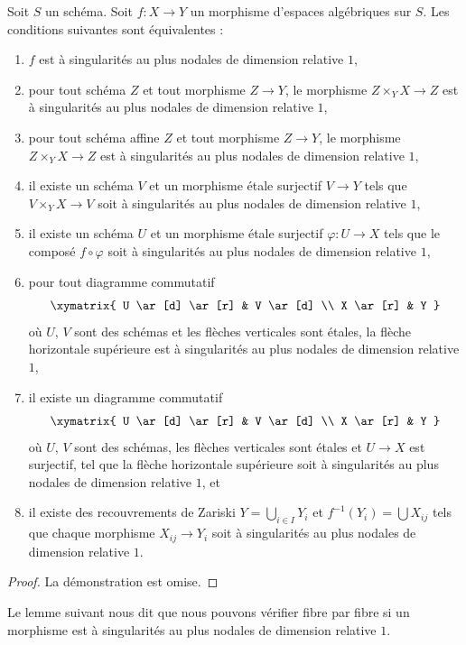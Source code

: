 \begin{lemma}
\label{lemma-nodal-local}
Soit $S$ un schéma.
Soit $f : X \to Y$ un morphisme d'espaces algébriques sur $S$.
Les conditions suivantes sont équivalentes :
\begin{enumerate}
\item $f$ est à singularités au plus nodales de dimension relative $1$,
\item pour tout schéma $Z$ et tout morphisme $Z \to Y$, le morphisme
$Z \times_Y X \to Z$ est à singularités au plus nodales de dimension relative $1$,
\item pour tout schéma affine $Z$ et tout morphisme
$Z \to Y$, le morphisme $Z \times_Y X \to Z$ est
à singularités au plus nodales de dimension relative $1$,
\item il existe un schéma $V$ et un morphisme \'etale surjectif
$V \to Y$ tels que $V \times_Y X \to V$ soit
à singularités au plus nodales de dimension relative $1$,
\item il existe un schéma $U$ et un morphisme \'etale surjectif
$\varphi : U \to X$ tels que le composé $f \circ \varphi$
soit à singularités au plus nodales de dimension relative $1$,
\item pour tout diagramme commutatif
$$
\xymatrix{
U \ar[d] \ar[r] & V \ar[d] \\
X \ar[r] & Y
}
$$
où $U$, $V$ sont des schémas et les flèches verticales sont \'etales,
la flèche horizontale supérieure est à singularités au plus nodales de dimension relative $1$,
\item il existe un diagramme commutatif
$$
\xymatrix{
U \ar[d] \ar[r] & V \ar[d] \\
X \ar[r] & Y
}
$$
où $U$, $V$ sont des schémas, les flèches verticales sont \'etales et
$U \to X$ est surjectif, tel que la flèche horizontale supérieure soit
à singularités au plus nodales de dimension relative $1$, et
\item il existe des recouvrements de Zariski $Y = \bigcup_{i \in I} Y_i$
et $f^{-1}(Y_i) = \bigcup X_{ij}$ tels que
chaque morphisme $X_{ij} \to Y_i$ soit
à singularités au plus nodales de dimension relative $1$.
\end{enumerate}
\end{lemma}

\begin{proof}
La démonstration est omise.
\end{proof}

\noindent
Le lemme suivant nous dit que nous pouvons vérifier fibre par fibre si un morphisme
est à singularités au plus nodales de dimension relative $1$.

